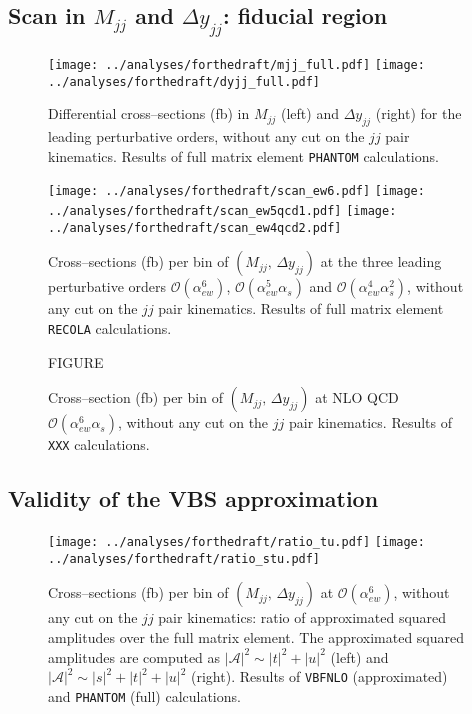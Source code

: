 \subsection{Scan in $M_{jj}$ and $\Delta y_{jj}$: fiducial region}\label{subsec:scan_full}
\begin{figure}[hbt]
\centering
\texttt{[image: ../analyses/forthedraft/mjj\_full.pdf]}
\texttt{[image: ../analyses/forthedraft/dyjj\_full.pdf]}
\caption{Differential cross--sections (fb) in $M_{jj}$ (left) and $\Delta y_{jj}$ (right) for the leading perturbative orders, without any cut on the $jj$ pair kinematics. Results of full matrix element \texttt{PHANTOM} calculations.} \label{fig:mjjdyjj_1d}
\end{figure}
\begin{figure}[ht]
\centering
\texttt{[image: ../analyses/forthedraft/scan\_ew6.pdf]}
\texttt{[image: ../analyses/forthedraft/scan\_ew5qcd1.pdf]}
\texttt{[image: ../analyses/forthedraft/scan\_ew4qcd2.pdf]}
\caption{Cross--sections (fb) per bin of $(M_{jj},\,\Delta y_{jj})$ at the three leading perturbative orders $\mathcal{O}(\alpha_{ew}^6)$, $\mathcal{O}(\alpha_{ew}^5\alpha_s)$ and $\mathcal{O}(\alpha_{ew}^4 \alpha_s^2)$, without any cut on the $jj$ pair kinematics. Results of full matrix element \texttt{RECOLA} calculations.}\label{fig:mjjdyjj_2d_LO}
\end{figure}

\begin{figure}[hbt]
\centering
FIGURE
\caption{Cross--section (fb) per bin of $(M_{jj},\,\Delta y_{jj})$ at NLO QCD $\mathcal{O}(\alpha_{ew}^6\alpha_s)$, without any cut on the $jj$ pair kinematics. Results of \texttt{XXX} calculations.}\label{fig:mjjdyjj_2d_NLO}
\end{figure}
\newpage
\subsection{Validity of the VBS approximation}\label{subsec:VBSapprox}
\begin{figure}[hbt]
\centering
\texttt{[image: ../analyses/forthedraft/ratio\_tu.pdf]}
\texttt{[image: ../analyses/forthedraft/ratio\_stu.pdf]}
\caption{Cross--sections (fb) per bin of $(M_{jj},\,\Delta y_{jj})$ at $\mathcal{O}(\alpha_{ew}^6)$, without any cut on the $jj$ pair kinematics: ratio of approximated squared amplitudes over the full matrix element. The approximated squared amplitudes are computed as $|\mathcal{A}|^2 \sim |t|^2 + |u|^2$ (left) and $|\mathcal{A}|^2 \sim |s|^2 + |t|^2 + |u|^2$ (right). Results of \texttt{VBFNLO} (approximated) and \texttt{PHANTOM} (full) calculations.}\label{fig:ratio2d_LO}
\end{figure}

